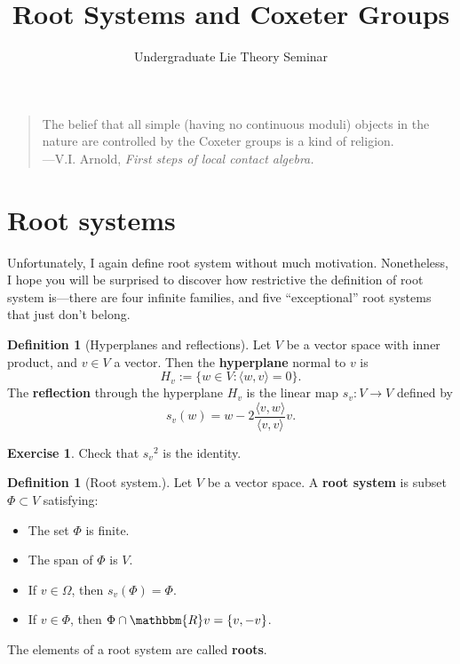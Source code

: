 \documentclass[12pt]{article}
\title{Root Systems and Coxeter Groups}
\author{Undergraduate Lie Theory Seminar}
\date{}
\theoremstyle{remark}
\theoremstyle{definition}
\newtheorem{defn}[thm]{Definition}
\newtheorem{exercise}[thm]{Exercise}
\newcommand{\defnword}[1]{\textbf{#1}}
\newcommand{\R}{\mathbbm{R}}
\begin{document}
\maketitle

\begin{quote}
The belief that all simple (having no continuous moduli) objects in 
the nature are controlled by the Coxeter groups is a kind of religion. \\
\null\hfill---V.I. Arnold, \textit{First steps of local contact algebra.}
\end{quote}


\section{Root systems}

Unfortunately, I again define root system without much motivation.
Nonetheless, I hope you will be surprised to discover how restrictive
the definition of root system is---there are four infinite families,
and five ``exceptional'' root systems that just don't belong.

\begin{defn}[Hyperplanes and reflections]
Let $V$ be a vector space with inner product, and $v \in V$ a vector.
Then the \defnword{hyperplane} normal to $v$ is
$$
H_v := \{ w \in V : \langle w, v \rangle = 0 \}.
$$
The \defnword{reflection} through the hyperplane $H_v$ is the linear map $s_v : V \to V$ defined by
$$
s_v(w) = w - 2 \frac{\langle v, w \rangle}{\langle v, v \rangle} v.
$$
\end{defn}

\begin{exercise}
Check that ${s_v}^2$ is the identity.
\end{exercise}

\begin{defn}[Root system.]
Let $V$ be a vector space.  A \defnword{root system} is subset $\Phi
\subset V$ satisfying:
\begin{itemize}
\item The set $\Phi$ is finite.
\item The span of $\Phi$ is $V$.
\item If $v \in \Omega$, then $s_v(\Phi) = \Phi$.
\item If $v \in \Phi$, then $\Phi \cap \R v = \{ v, -v \}$.
\end{itemize}
The elements of a root system are called \defnword{roots}.
\end{defn}
\end{document}
